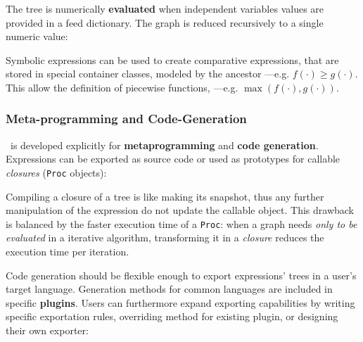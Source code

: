 \noindent%


The tree is numerically \textbf{evaluated} when independent variables values are provided in a feed dictionary. The graph is reduced recursively to a single numeric value:

\noindent%



Symbolic expressions can be used to create comparative expressions, that are stored in special container classes, modeled by the ancestor \CASExpression---e.g. $f(\cdot) \geq g(\cdot)$. This allow the definition of piecewise functions, ---e.g. $\max(f(\cdot), g(\cdot))$.

\noindent%


\subsubsection{Meta-programming and Code-Generation}

\ragnicas~is developed explicitly for \textbf{meta\-programming} and \textbf{code generation}. Expressions can be exported as source code or used as prototypes for callable \emph{closures} (\texttt{Proc} objects):

\noindent%


Compiling a closure of a tree is like making its snapshot, thus any further manipulation of the expression do not update the callable object. This drawback is balanced by the faster execution time of a \texttt{Proc}: when a graph needs \emph{only to be evaluated} in a iterative algorithm, transforming it in a \emph{closure} reduces the execution time per iteration.

Code generation should be flexible enough to export expressions' trees in a user's target language. Generation methods for common languages are included in specific \textbf{plugins}. Users can furthermore expand exporting capabilities by writing specific exportation rules, overriding method for existing plugin, or designing their own exporter:

\noindent%

